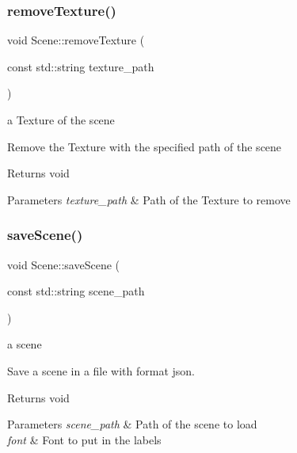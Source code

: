\subsubsection{\texorpdfstring{remove\+Texture()}{removeTexture()}}
{\footnotesize\ttfamily void Scene\+::remove\+Texture (\begin{DoxyParamCaption}\item[{const std\+::string}]{texture\+\_\+path }\end{DoxyParamCaption})}

a Texture of the scene

Remove the Texture with the specified path of the scene

\begin{DoxyReturn}{Returns}
void 
\end{DoxyReturn}

\begin{DoxyParams}{Parameters}
{\em texture\+\_\+path} & Path of the Texture to remove \\
\hline
\end{DoxyParams}
\mbox{\label{class_scene_a70c218eb67b3507a56486e1dd945f095}} 
\subsubsection{\texorpdfstring{save\+Scene()}{saveScene()}}
{\footnotesize\ttfamily void Scene\+::save\+Scene (\begin{DoxyParamCaption}\item[{const std\+::string}]{scene\+\_\+path }\end{DoxyParamCaption})}

a scene

Save a scene in a file with format json.

\begin{DoxyReturn}{Returns}
void 
\end{DoxyReturn}

\begin{DoxyParams}{Parameters}
{\em scene\+\_\+path} & Path of the scene to load \\
\hline
{\em font} & Font to put in the labels \\
\hline
\end{DoxyParams}
\mbox{\label{class_scene_aa24c7e636c10e4e42650c1374b90bb80}} 
